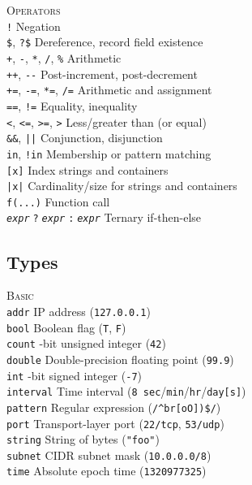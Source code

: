 \documentclass[10pt,landscape]{article}
\newcommand{\minisec}[1]{\textsc{#1}\\}
\begin{document}
\begin{multicols*}{3}
\minisec{Operators}
\verb|!| \dotfill Negation\\
\verb|$|, \verb|?$| \dotfill Dereference, record field existence\\
\verb|+|, \verb|-|, \verb|*|, \verb|/|, \verb|%| \dotfill Arithmetic\\
\verb|++|, \verb|--| \dotfill Post-increment, post-decrement\\
\verb|+=|, \verb|-=|, \verb|*=|, \verb|/=| \dotfill Arithmetic and assignment\\
\verb|==|, \verb|!=| \dotfill Equality, inequality\\
\verb|<|, \verb|<=|, \verb|>=|, \verb|>|
  \dotfill Less/greater than (or equal)\\
\verb|&&|, \verb#||# \dotfill Conjunction, disjunction\\
\verb|in|, \verb|!in| \dotfill Membership or pattern matching\\
\verb|[x]| \dotfill Index strings and containers\\
\verb#|x|# \dotfill Cardinality/size for strings and containers\\
\verb|f(...)| \dotfill Function call\\
\texttt{\textit{expr}$\;$?$\;$\textit{expr}$\;$:$\;$\textit{expr}}
  \dotfill Ternary if-then-else

\subsection*{Types}

\minisec{Basic}
\verb|addr| \dotfill IP address (\verb|127.0.0.1|)\\
\verb|bool| \dotfill Boolean flag (\verb|T|, \verb|F|)\\
\verb|count| -bit unsigned integer (\verb|42|)\\
\verb|double| \dotfill Double-precision floating point (\verb|99.9|)\\
\verb|int| -bit signed integer (\verb|-7|)\\
\verb|interval| \dotfill Time interval
  (\verb|8 sec|/\verb|min|/\verb|hr|/\verb|day[s]|)\\
\verb|pattern| \dotfill Regular expression (\verb|/^br[oO])$/|)\\
\verb|port| \dotfill Transport-layer port
  (\verb|22/tcp|, \verb|53/udp|)\\
\verb|string| \dotfill String of bytes (\verb|"foo"|)\\
\verb|subnet| \dotfill CIDR subnet mask (\verb|10.0.0.0/8|)\\
\verb|time| \dotfill Absolute epoch time (\verb|1320977325|)\\


\end{multicols*}
\end{document}
